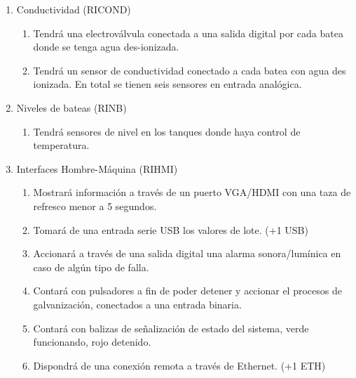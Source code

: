 \begin{enumerate}
\begin{enumerate}
\item Conductividad (RICOND)
\begin{enumerate}
\item Tendrá una electroválvula conectada a una salida digital por cada batea donde se tenga agua des-ionizada. 
\item Tendrá un sensor de conductividad conectado a cada batea con agua des ionizada. En total se tienen seis sensores en entrada analógica. 
\end{enumerate}

\item Niveles de bateas (RINB)
\begin{enumerate}
\item Tendrá sensores de nivel en los tanques donde haya control de temperatura. 
\end{enumerate}

\item Interfaces Hombre-Máquina (RIHMI)
\begin{enumerate}
\item Mostrará información a través de un puerto VGA/HDMI con una taza de refresco menor a 5 segundos.
\item Tomará de una entrada serie USB los valores de lote. (+1 USB)
\item Accionará a través de una salida digital una alarma sonora/lumínica en caso de algún tipo de falla. 
\item Contará con pulsadores a fin de poder detener y accionar el procesos de galvanización, conectados a una entrada binaria.
\item Contará con balizas de señalización de estado del sistema, verde funcionando, rojo detenido. 
\item Dispondrá de una conexión remota a través de Ethernet. (+1 ETH)
\end{enumerate}

\end{enumerate}


\end{enumerate}
